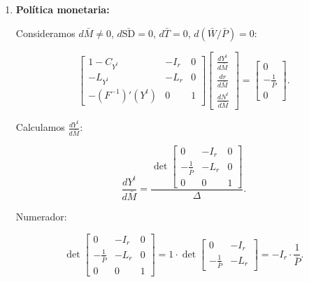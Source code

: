 \documentclass[
  doc,
  floatsintext,
  longtable,
  a4paper,
  nolmodern,
  notxfonts,
  notimes,
  12pt,
  colorlinks=true,linkcolor=blue,citecolor=blue,urlcolor=blue]{apa7}
\begin{document}
\begin{enumerate}
  \[
  \Delta = \begin{vmatrix}
  1 - C_{Y^t} & -I_r & 0 \\
  -L_{Y^t} & -L_r & 0 \\
  -(F^{-1})'(Y^t) & 0 & 1
  \end{vmatrix}.
  \]

  Expandiendo por la tercera columna:

  \[
  \Delta = 1 \cdot \det \begin{bmatrix}
  1 - C_{Y^t} & -I_r \\
  -L_{Y^t} & -L_r
  \end{bmatrix} = (1 - C_{Y^t})(-L_r) - (-I_r)(-L_{Y^t}) = L_r (1 - C_{Y^t}) + I_r L_{Y^t}.
  \]

  Dado que \(L_r < 0\), \(I_r < 0\), \(L_{Y^t} > 0\),
  \(1 - C_{Y^t} > 0\), entonces \(\Delta > 0\).
\item
  \textbf{Política monetaria:}

  Consideramos \(d\bar{M} \neq 0\), \(d\bar{\mathrm{SD}} = 0\),
  \(d\bar{T} = 0\), \(d(\bar{W}/\bar{P}) = 0\):

  \[
  \begin{bmatrix}
  1 - C_{Y^t} & -I_r & 0 \\
  -L_{Y^t} & -L_r & 0 \\
  -(F^{-1})'(Y^t) & 0 & 1
  \end{bmatrix}
  \begin{bmatrix}
  \frac{dY^t}{d\bar{M}} \\
  \frac{dr}{d\bar{M}} \\
  \frac{dN^t}{d\bar{M}}
  \end{bmatrix}
  =
  \begin{bmatrix}
  0 \\
  -\frac{1}{\bar{P}} \\
  0
  \end{bmatrix}.
  \]

  Calculamos \(\frac{dY^t}{d\bar{M}}\):

  \[
  \frac{dY^t}{d\bar{M}} = \frac{\det \begin{bmatrix}
  0 & -I_r & 0 \\
  -\frac{1}{\bar{P}} & -L_r & 0 \\
  0 & 0 & 1
  \end{bmatrix}}{\Delta}.
  \]

  Numerador:

  \[
  \det \begin{bmatrix}
  0 & -I_r & 0 \\
  -\frac{1}{\bar{P}} & -L_r & 0 \\
  0 & 0 & 1
  \end{bmatrix} = 1 \cdot \det \begin{bmatrix}
  0 & -I_r \\
  -\frac{1}{\bar{P}} & -L_r
  \end{bmatrix} = -I_r \cdot \frac{1}{\bar{P}}.
  \]


\end{enumerate}
\end{document}
